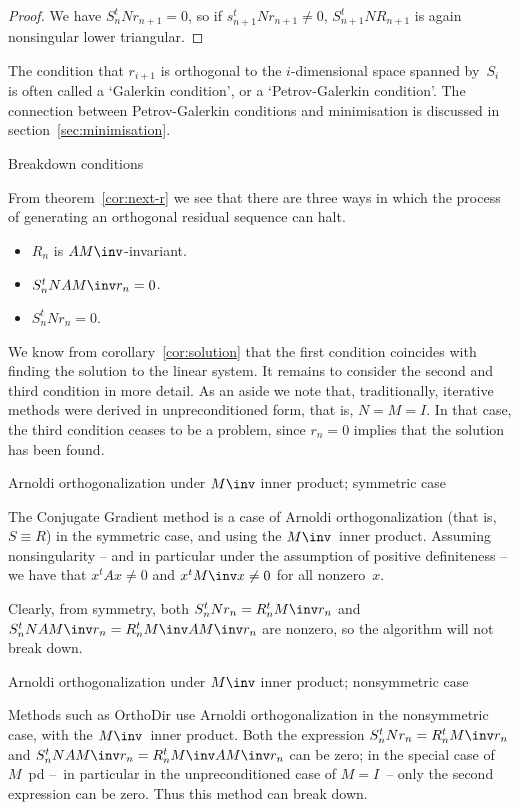 \documentclass[11pt]{artikel3}
\begin{document}
\begin{Outline}
\begin{proof}
We have $S_n^tN r_{n+1}=0$, so if $s_{n+1}^tN r_{n+1}\not=0$,
$S_{n+1}^tN R_{n+1}$ is again nonsingular lower triangular.
\end{proof}

The condition that $r_{i+1}$ is orthogonal to the $i$-dimensional space
spanned by~$S_i$ is often called a `Galerkin condition',
or a `Petrov-Galerkin condition'.
The connection between 
Petrov-Galerkin conditions and minimisation is discussed 
in section~\ref{sec:minimisation}.

 {Breakdown conditions}
\label{sec:breakdown:theory}

From theorem~\ref{cor:next-r} we see that there are three ways in which 
the process of generating an orthogonal residual sequence can halt.
\begin{itemize}
\item $R_n$ is $AM\inv$-invariant.
\item $S_n^tN AM\inv r_n=0$.
\item $S_n^tN r_n=0$.
\end{itemize}
We know from corollary~\ref{cor:solution} that the first
condition coincides with finding the solution to the linear system.
It remains to consider the second and third condition in more detail.
As an aside we note that, traditionally, iterative methods were
derived in unpreconditioned form, that is, $N=M=I$. In that case, the
third condition ceases to be a problem, since $r_n=0$ implies that the
solution has been found.

 {Arnoldi orthogonalization under $M\inv$ inner product;
symmetric case}
\label{sec:symmetric-breakdown}

The Conjugate Gradient method is a case of Arnoldi orthogonalization
(that is, $S\equiv R$) in the symmetric case, and 
using the $M\inv$~inner product. 
Assuming nonsingularity -- and in particular under the assumption of
positive definiteness -- we have that $x^tAx\not=0$ 
and $x^tM\inv x\not=0$ for all nonzero~$x$.

Clearly, from symmetry, both $S_n^tN r_n=R_n^tM\inv r_n$ and
$S_n^tN AM\inv r_n=R_n^tM\inv AM\inv r_n$ are nonzero,
so the algorithm will not break down.

 {Arnoldi orthogonalization under $M\inv$ inner product;
nonsymmetric case}

Methods such as OrthoDir use Arnoldi orthogonalization in the 
nonsymmetric case, with the $M\inv$~inner product.
Both the expression $S_n^tN r_n=R_n^tM\inv r_n$ 
and $S_n^tN AM\inv r_n=R_n^tM\inv AM\inv r_n$ can be zero;
in the special case of $M$~pd
--~in particular in the unpreconditioned case of $M=I$~--
only the second expression can be zero.
Thus this method can break down.


\end{Outline}
\end{document}
